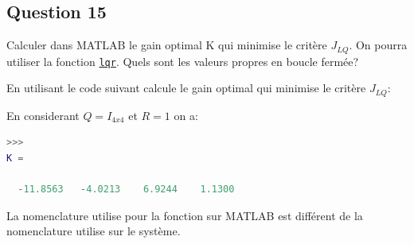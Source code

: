 \documentclass[class=article, crop=false]{standalone}
\begin{document}
\newpage
\subsection{Question 15}
\begin{exercise}
    Calculer dans MATLAB le gain optimal K qui minimise le critère $J_{LQ}$. On pourra utiliser la fonction \href{https://www.mathworks.com/help/control/ref/lti.lqr.html}{\texttt{lqr}}. Quels sont les valeurs propres en boucle fermée?
\end{exercise}
\begin{resolution}
    En utilisant le code suivant calcule le gain optimal qui minimise le critère $J_{LQ}$:
    \begin{scriptsize}\mycode
        
    \end{scriptsize}
    En considerant $Q = I_{4x4}$ et $R = 1$ on a:
    \begin{scriptsize}\mycode
        \begin{lstlisting}[language=Matlab]
>>>
K =

  -11.8563   -4.0213    6.9244    1.1300
        \end{lstlisting}
    \end{scriptsize}
    \begin{remark}
        La nomenclature utilise pour la fonction sur MATLAB est différent de la nomenclature utilise sur le système.
    \end{remark}
\end{resolution}

\newpage
\end{document}

